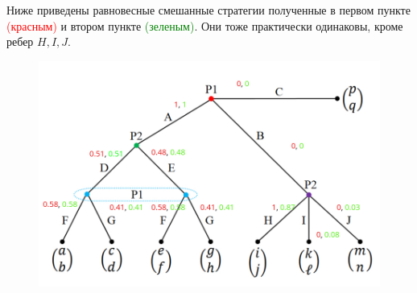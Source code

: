 \documentclass{article}
\begin{document}
    Ниже приведены равновесные смешанные стратегии полученные в первом пункте \textcolor{red}{(красным)} и втором пункте \textcolor{green}{(зеленым)}. Они тоже практически одинаковы, кроме ребер $H, I, J$.
    \begin{figure}[ht]

        \includegraphics[width=1\linewidth]{imgs/task3_res.jpg}

    \end{figure}     
\end{document}
